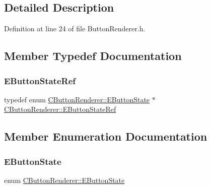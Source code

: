 \subsection{Detailed Description}


Definition at line 24 of file Button\+Renderer.\+h.



\subsection{Member Typedef Documentation}
\hypertarget{classCButtonRenderer_a402e6dc71de924ff3daf036e31048ce7}{}\label{classCButtonRenderer_a402e6dc71de924ff3daf036e31048ce7} 
\subsubsection{\texorpdfstring{E\+Button\+State\+Ref}{EButtonStateRef}}
{\footnotesize\ttfamily typedef  enum \hyperlink{classCButtonRenderer_ae0eccda184600f6e14bfd59033e5e9a1}{C\+Button\+Renderer\+::\+E\+Button\+State} $\ast$ \hyperlink{classCButtonRenderer_a402e6dc71de924ff3daf036e31048ce7}{C\+Button\+Renderer\+::\+E\+Button\+State\+Ref}}



\subsection{Member Enumeration Documentation}
\hypertarget{classCButtonRenderer_ae0eccda184600f6e14bfd59033e5e9a1}{}\label{classCButtonRenderer_ae0eccda184600f6e14bfd59033e5e9a1} 
\subsubsection{\texorpdfstring{E\+Button\+State}{EButtonState}}
{\footnotesize\ttfamily enum \hyperlink{classCButtonRenderer_ae0eccda184600f6e14bfd59033e5e9a1}{C\+Button\+Renderer\+::\+E\+Button\+State}}

